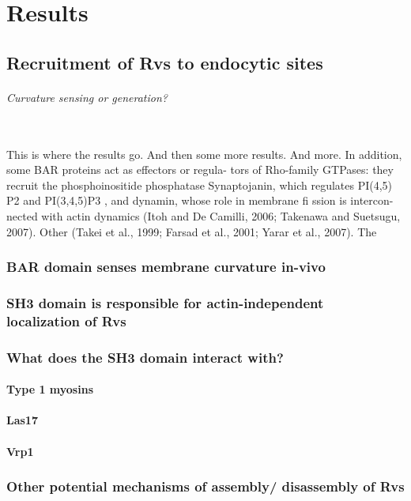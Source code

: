 \chapter{Results}    \label{results}
\section{Recruitment of Rvs to endocytic sites}

	\subparagraph{Curvature sensing or generation? }
	\mbox{}\\
	This is where the results go. And then some more results. And more.
In addition, some BAR proteins act as effectors or regula- tors of Rho-family GTPases: they recruit the phosphoinositide phosphatase Synaptojanin, which regulates PI(4,5) P2
and PI(3,4,5)P3 , and dynamin, whose
role in membrane fi ssion is intercon- nected with actin dynamics (Itoh and De Camilli, 2006; Takenawa and Suetsugu,
2007). Other
(Takei et al., 1999; Farsad et al., 2001; Yarar et al., 2007). The

	\subsection{BAR domain senses membrane curvature in-vivo}
	\subsection{SH3 domain is responsible for actin-independent	\\
		localization of Rvs}
	\subsection{What does the SH3 domain interact with?}
		\subsubsection{Type 1 myosins}
		\subsubsection{Las17}
		\subsubsection{Vrp1}

	\subsection{Other potential mechanisms of assembly/ disassembly of Rvs}		
